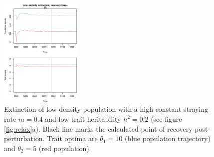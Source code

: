\documentclass[twocolumn,preprintnumbers,amsmath,amssymb,superscriptaddress]{revtex4}
\newcommand{\beginsupplement}{%
        \clearpage
        \setcounter{table}{0}
        \renewcommand{\thetable}{S\arabic{table}}%
        \setcounter{figure}{0}
        \renewcommand{\thefigure}{S\arabic{figure}}%
     }
\begin{document}



\beginsupplement


\begin{figure}
  \captionsetup{justification=raggedright,
singlelinecheck=false
}
\centering
\includegraphics[width=0.35\textwidth]{figs2/fig_relax_small.pdf}
\caption{
Extinction of low-density population with a high constant straying rate $m=0.4$ and low trait heritability $h^2=0.2$ (see figure \ref{fig:relax}a).
Black line marks the calculated point of recovery post-perturbation.
Trait optima are $\theta_1 = 10$ (blue population trajectory) and $\theta_2 = 5$ (red population).
} \label{fig:relaxtraj_ldlh}
\end{figure}
\end{document}

